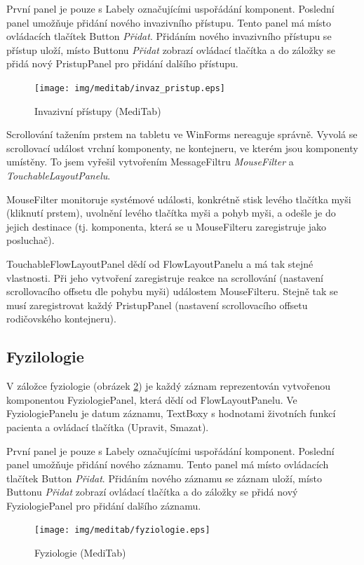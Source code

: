 První panel je pouze s Labely označujícími uspořádání komponent. Poslední panel umožňuje přidání nového invazivního přístupu. Tento panel má místo ovládacích tlačítek Button \emph{Přidat}. Přidáním nového invazivního přístupu se přístup uloží, místo Buttonu \emph{Přidat} zobrazí ovládací tlačítka a do záložky se přidá nový PristupPanel pro přidání dalšího přístupu.

\begin{figure}[H]
	\centering
	\texttt{[image: img/meditab/invaz\_pristup.eps]}
	\caption{Invazivní přístupy (MediTab)}
  \label{fig:invaz_pristup}
\end{figure}

Scrollování tažením prstem na tabletu ve WinForms nereaguje správně. Vyvolá se scrollovací událost vrchní komponenty, ne kontejneru, ve kterém jsou komponenty umístěny. To jsem vyřešil vytvořením MessageFiltru \emph{MouseFilter} a \emph{TouchableLayoutPanelu}.

MouseFilter monitoruje systémové události, konkrétně stisk levého tlačítka myši (kliknutí prstem), uvolnění levého tlačítka myši a pohyb myši, a odešle je do jejich destinace (tj. komponenta, která se u MouseFilteru zaregistruje jako posluchač). 

TouchableFlowLayoutPanel dědí od FlowLayoutPanelu a má tak stejné vlastnosti. Při jeho vytvoření zaregistruje reakce na scrollování (nastavení scrollovacího offsetu dle pohybu myši) událostem MouseFilteru. Stejně tak se musí zaregistrovat každý PristupPanel (nastavení scrollovacího offsetu rodičovského kontejneru).


\subsection{Fyzilologie}

V záložce fyziologie (obrázek \ref{fig:fyziologie}) je každý záznam reprezentován vytvořenou komponentou FyziologiePanel, která dědí od FlowLayoutPanelu. Ve FyziologiePanelu je datum záznamu, TextBoxy s hodnotami životních funkcí pacienta a ovládací tlačítka (Upravit, Smazat).

První panel je pouze s Labely označujícími uspořádání komponent. Poslední panel umožňuje přidání nového záznamu. Tento panel má místo ovládacích tlačítek Button \emph{Přidat}. Přidáním nového záznamu se záznam uloží, místo Buttonu \emph{Přidat} zobrazí ovládací tlačítka a do záložky se přidá nový FyziologiePanel pro přidání dalšího záznamu.

\begin{figure}[H]
	\centering
	\texttt{[image: img/meditab/fyziologie.eps]}
	\caption{Fyziologie (MediTab)}
  \label{fig:fyziologie}
\end{figure}

